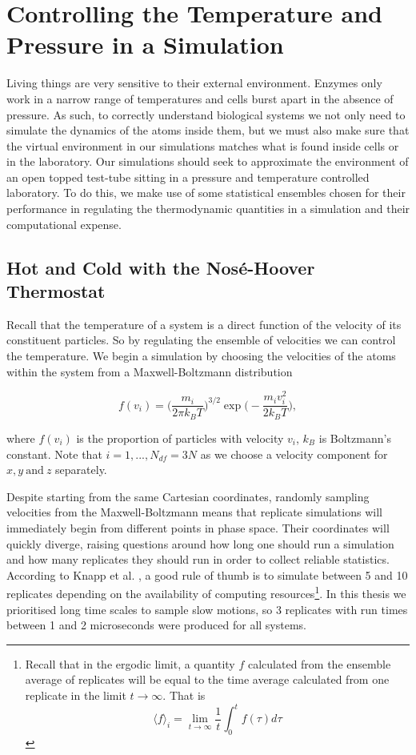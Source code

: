 \section{Controlling the Temperature and Pressure in a Simulation}
Living things are very sensitive to their external environment. Enzymes only work in a narrow range of temperatures and cells burst apart in the absence of pressure\cite{peterson2007, song2012}. As such, to correctly understand biological systems we not only need to simulate the dynamics of the atoms inside them, but we must also make sure that the virtual environment in our simulations matches what is found inside cells or in the laboratory. Our simulations should seek to approximate the environment of an open topped test-tube sitting in a pressure and temperature controlled laboratory. To do this, we make use of some statistical ensembles chosen for their performance in regulating the thermodynamic quantities in a simulation and their computational expense.  


\subsection{Hot and Cold with the Nos\'e-Hoover Thermostat}
Recall that the temperature of a system is a direct function of the velocity of its constituent particles. So by regulating the ensemble of velocities we can control the temperature. We begin a simulation by choosing the velocities of the atoms within the system from a Maxwell-Boltzmann distribution 

\begin{equation}
	f(v_i) = \Big(\frac{m_i}{2\pi k_B T}\Big)^{3/2} \exp{\Big(-\frac{m_iv_i^2}{2k_BT}\Big)},
\end{equation}

where $f(v_i)$ is the proportion of particles with velocity $v_i$, $k_B$ is Boltzmann's constant. Note that $i=1,...,N_{df}=3N$ as we choose a velocity component for $x,y \ \text{and}\  z$ separately. 

Despite starting from the same Cartesian coordinates, randomly sampling velocities from the Maxwell-Boltzmann means that replicate simulations will immediately begin from different points in phase space. Their coordinates will quickly diverge, raising questions around how long one should run a simulation and how many replicates they should run in order to collect reliable statistics. According to Knapp et al. \cite{knapp2018}, a good rule of thumb is to simulate between 5 and 10 replicates depending on the availability of computing resources\footnote{Recall that in the ergodic limit, a quantity $f$ calculated from the ensemble average of replicates will be equal to the time average calculated from one replicate in the limit $t\to\infty.$ That is $$ \langle f \rangle_i = \lim_{t \to \infty } \frac{1}{t} \int_0^tf(\tau)d\tau $$}. In this thesis we prioritised long time scales to sample slow motions, so 3 replicates with run times between 1 and 2 microseconds were produced for all systems. 

